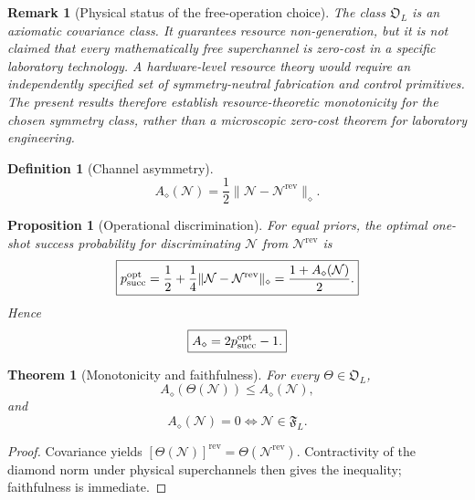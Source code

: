 \documentclass[reprint,amsmath,amssymb,aps,nofootinbib]{revtex4-2}
\newtheorem{definition}{Definition}
\newtheorem{theorem}{Theorem}
\newtheorem{proposition}{Proposition}
\newtheorem{remark}{Remark}
\newcommand{\F}{\mathfrak F}
\newcommand{\FreeOps}{\mathfrak O}
\newcommand{\rev}{\mathrm{rev}}
\begin{document}
\begin{remark}[Physical status of the free-operation choice]
The class $\FreeOps_L$ is an axiomatic covariance class. It guarantees resource non-generation,
but it is not claimed that every mathematically free superchannel is zero-cost in a specific
laboratory technology. A hardware-level resource theory would require an independently specified set of symmetry-neutral
fabrication and control primitives. The present results therefore establish resource-theoretic
monotonicity for the chosen symmetry class, rather than a microscopic zero-cost theorem for laboratory
engineering.
\end{remark}

\begin{definition}[Channel asymmetry]
\begin{equation}
\boxed{
A_\diamond(\mathcal N)=\frac12\|\mathcal N-\mathcal N^{\rev}\|_\diamond.
}
\end{equation}
\end{definition}

\begin{proposition}[Operational discrimination]
For equal priors, the optimal one-shot success probability for discriminating $\mathcal N$ from
$\mathcal N^{\rev}$ is
\begin{equation}
\boxed{
 p_{\rm succ}^{\rm opt}=\frac12+\frac14\|\mathcal N-\mathcal N^{\rev}\|_\diamond
 =\frac{1+A_\diamond(\mathcal N)}2.}
\end{equation}
Hence
\begin{equation}
\boxed{A_\diamond=2p_{\rm succ}^{\rm opt}-1.}
\end{equation}
\end{proposition}

\begin{theorem}[Monotonicity and faithfulness]
For every $\Theta\in\FreeOps_L$,
\begin{equation}
\boxed{A_\diamond(\Theta(\mathcal N))\le A_\diamond(\mathcal N),}
\end{equation}
and
\begin{equation}
A_\diamond(\mathcal N)=0\iff \mathcal N\in\F_L.
\end{equation}
\end{theorem}

\begin{proof}
Covariance yields
$[\Theta(\mathcal N)]^{\rev}=\Theta(\mathcal N^{\rev})$.
Contractivity of the diamond norm under physical superchannels then gives the inequality;
faithfulness is immediate.
\end{proof}
\end{document}
